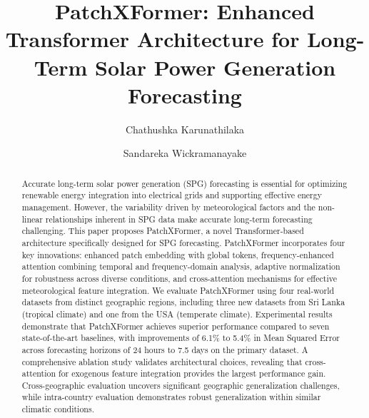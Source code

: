 \documentclass[a4paper,fleqn]{cas-dc}
\begin{document}
\let\WriteBookmarks\relax
\def\floatpagepagefraction{1}
\def\textpagefraction{.001}


\title[mode = title]{PatchXFormer: Enhanced Transformer Architecture for Long-Term Solar Power Generation Forecasting}

\author[1]{Chathushka Karunathilaka}

\author[1]{Sandareka Wickramanayake}
\cormark[1]



\begin{abstract}
Accurate long-term solar power generation (SPG) forecasting is essential for optimizing renewable energy integration into electrical grids and supporting effective energy management. However, the variability driven by meteorological factors and the non-linear relationships inherent in SPG data make accurate long-term forecasting challenging. This paper proposes PatchXFormer, a novel Transformer-based architecture specifically designed for SPG forecasting. PatchXFormer incorporates four key innovations: enhanced patch embedding with global tokens, frequency-enhanced attention combining temporal and frequency-domain analysis, adaptive normalization for robustness across diverse conditions, and cross-attention mechanisms for effective meteorological feature integration. We evaluate PatchXFormer using four real-world datasets from distinct geographic regions, including three new datasets from Sri Lanka (tropical climate) and one from the USA (temperate climate). Experimental results demonstrate that PatchXFormer achieves superior performance compared to seven state-of-the-art baselines, with improvements of 6.1\% to 5.4\% in Mean Squared Error across forecasting horizons of 24 hours to 7.5 days on the primary dataset. A comprehensive ablation study validates architectural choices, revealing that cross-attention for exogenous feature integration provides the largest performance gain. Cross-geographic evaluation uncovers significant geographic generalization challenges, while intra-country evaluation demonstrates robust generalization within similar climatic conditions.
\end{abstract}
\end{document}
